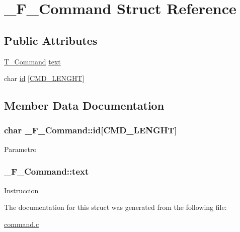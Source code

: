 \hypertarget{struct__F__Command}{\section{\+\_\+\+F\+\_\+\+Command Struct Reference}
\label{struct__F__Command}
}
\subsection*{Public Attributes}
\begin{DoxyCompactItemize}
\item 
\hyperlink{command_8h_a0473597db8c45c0289b6b8e2f8abbe32}{T\+\_\+\+Command} \hyperlink{struct__F__Command_a6a2c6e6db16dad0da7732cea69c07559}{text}
\item 
char \hyperlink{struct__F__Command_a138723d3b8278597200ae2ff43d8ef74}{id} \mbox{[}\hyperlink{command_8c_a2b1bd24d2eddf8081d8c541e4cc4fd4b}{C\+M\+D\+\_\+\+L\+E\+N\+G\+H\+T}\mbox{]}
\end{DoxyCompactItemize}


\subsection{Member Data Documentation}
\hypertarget{struct__F__Command_a138723d3b8278597200ae2ff43d8ef74}{
\subsubsection[{id}]{\setlength{\rightskip}{0pt plus 5cm}char \+\_\+\+F\+\_\+\+Command\+::id\mbox{[}{\bf C\+M\+D\+\_\+\+L\+E\+N\+G\+H\+T}\mbox{]}}}\label{struct__F__Command_a138723d3b8278597200ae2ff43d8ef74}
Parametro \hypertarget{struct__F__Command_a6a2c6e6db16dad0da7732cea69c07559}{
\subsubsection[{text}]{ \+\_\+\+F\+\_\+\+Command\+::text}}\label{struct__F__Command_a6a2c6e6db16dad0da7732cea69c07559}
Instruccion 

The documentation for this struct was generated from the following file\+:\begin{DoxyCompactItemize}
\item 
\hyperlink{command_8c}{command.\+c}\end{DoxyCompactItemize}
